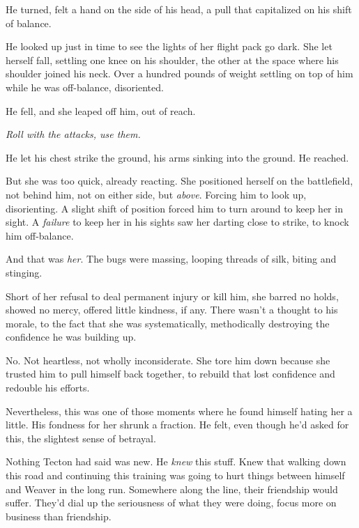 He turned, felt a hand on the side of his head, a pull that capitalized on his shift of balance.



He looked up just in time to see the lights of her flight pack go dark.  She let herself fall, settling one knee on his shoulder, the other at the space where his shoulder joined his neck.  Over a hundred pounds of weight settling on top of him while he was off-balance, disoriented.



He fell, and she leaped off him, out of reach.



\emph{Roll with the attacks, use them.}



He let his chest strike the ground, his arms sinking into the ground.  He reached.



But she was too quick, already reacting.  She positioned herself on the battlefield, not behind him, not on either side, but \emph{above}.  Forcing him to look up, disorienting.  A slight shift of position forced him to turn around to keep her in sight.  A \emph{failure} to keep her in his sights saw her darting close to strike, to knock him off-balance.



And that was \emph{her}.  The bugs were massing, looping threads of silk, biting and stinging.



Short of her refusal to deal permanent injury or kill him, she barred no holds, showed no mercy, offered little kindness, if any.  There wasn't a thought to his morale, to the fact that she was systematically, methodically destroying the confidence he was building up.



No.  Not heartless, not wholly inconsiderate.  She tore him down because she trusted him to pull himself back together, to rebuild that lost confidence and redouble his efforts.



Nevertheless, this was one of those moments where he found himself hating her a little.  His fondness for her shrunk a fraction.  He felt, even though he'd asked for this, the slightest sense of betrayal.



Nothing Tecton had said was new.  He \emph{knew} this stuff.  Knew that walking down this road and continuing this training was going to hurt things between himself and Weaver in the long run.  Somewhere along the line, their friendship would suffer.  They'd dial up the seriousness of what they were doing, focus more on business than friendship.



